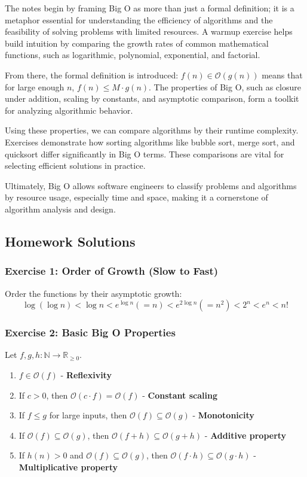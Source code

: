 \documentclass{article}
\begin{document}
The notes begin by framing Big O as more than just a formal definition; it is a metaphor essential for understanding the efficiency of algorithms and the feasibility of solving problems with limited resources. A warmup exercise helps build intuition by comparing the growth rates of common mathematical functions, such as logarithmic, polynomial, exponential, and factorial.

From there, the formal definition is introduced: $f(n) \in \mathcal{O}(g(n))$ means that for large enough $n$, $f(n) \leq M \cdot g(n)$. The properties of Big O, such as closure under addition, scaling by constants, and asymptotic comparison, form a toolkit for analyzing algorithmic behavior.

Using these properties, we can compare algorithms by their runtime complexity. Exercises demonstrate how sorting algorithms like bubble sort, merge sort, and quicksort differ significantly in Big O terms. These comparisons are vital for selecting efficient solutions in practice.

Ultimately, Big O allows software engineers to classify problems and algorithms by resource usage, especially time and space, making it a cornerstone of algorithm analysis and design.

\subsection{Homework Solutions}

\subsubsection{Exercise 1: Order of Growth (Slow to Fast)}
Order the functions by their asymptotic growth:
\[
\log(\log n) < \log n < e^{\log n} (= n) < e^{2\log n} (= n^2) < 2^n < e^n < n!
\]

\subsubsection{Exercise 2: Basic Big O Properties}
Let $f, g, h : \mathbb{N} \to \mathbb{R}_{\ge 0}$.
\begin{enumerate}
    \item $f \in \mathcal{O}(f)$ - \textbf{Reflexivity}
    \item If $c > 0$, then $\mathcal{O}(c \cdot f) = \mathcal{O}(f)$ - \textbf{Constant scaling}
    \item If $f \le g$ for large inputs, then $\mathcal{O}(f) \subseteq \mathcal{O}(g)$ - \textbf{Monotonicity}
    \item If $\mathcal{O}(f) \subseteq \mathcal{O}(g)$, then $\mathcal{O}(f + h) \subseteq \mathcal{O}(g + h)$ - \textbf{Additive property}
    \item If $h(n) > 0$ and $\mathcal{O}(f) \subseteq \mathcal{O}(g)$, then $\mathcal{O}(f \cdot h) \subseteq \mathcal{O}(g \cdot h)$ - \textbf{Multiplicative property}
\end{enumerate}
\end{document}
